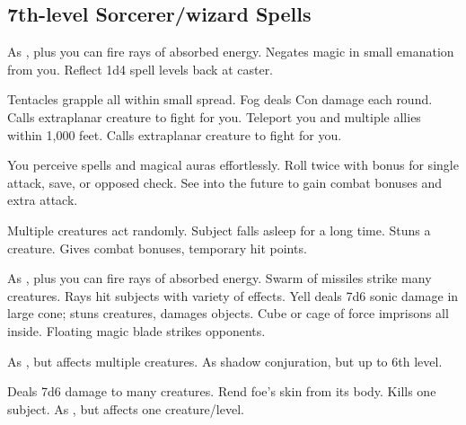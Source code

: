 \subsection{7th-level Sorcerer/wizard Spells}
\begin{swspelllist}
   As , plus you can fire rays of absorbed energy.
  \spellhead{}
   Negates magic in small emanation from you.
   Reflect 1d4 spell levels back at caster.

   Tentacles grapple all within small spread.
   Fog deals Con damage each round.
   Calls extraplanar creature to fight for you.
   Teleport you and multiple allies within 1,000 feet.
   Calls extraplanar creature to fight for you.

   You perceive spells and magical auras effortlessly.
   Roll twice with bonus for single attack, save, or opposed check.
  \spellheadrestricted{}
   See into the future to gain combat bonuses and extra attack.

   Multiple creatures act randomly.
   Subject falls asleep for a long time.
   Stuns a creature.
   Gives combat bonuses, temporary hit points.
  \spellheadrestricted{}

   As , plus you can fire rays of absorbed energy.
   Swarm of missiles strike many creatures.
   Rays hit subjects with variety of effects.
   Yell deals 7d6 sonic damage in large cone; stuns creatures, damages objects.
  \M Cube or cage of force imprisons all inside.
  \F Floating magic blade strikes opponents.

   As , but affects multiple creatures.
  \spellheadrestricted{}
   As shadow conjuration, but up to 6th level.

   Deals 7d6 damage to many creatures.
   Rend foe's skin from its body.
   Kills one subject.
   As , but affects one creature/level.


\end{swspelllist}
